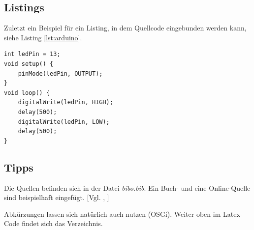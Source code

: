 \documentclass[12pt,a4paper,bibliography=totocnumbered,listof=totocnumbered]{scrartcl}
\begin{document}
\subsection{Listings}
Zuletzt ein Beispiel für ein Listing, in dem Quellcode eingebunden werden kann, siehe Listing \ref{lst:arduino}.

\vspace{1em}
\begin{lstlisting}[caption=Arduino Beispielprogramm, label=lst:arduino]
int ledPin = 13;
void setup() {
    pinMode(ledPin, OUTPUT);
}
void loop() {
    digitalWrite(ledPin, HIGH);
    delay(500);
    digitalWrite(ledPin, LOW);
    delay(500);
}
\end{lstlisting}

\subsection{Tipps}
Die Quellen befinden sich in der Datei \textit{bibo.bib}. Ein Buch- und eine Online-Quelle sind beispielhaft eingefügt. [Vgl. \cite{buch}, \cite{online}]

Abkürzungen lassen sich natürlich auch nutzen (\ac{OSGi}). Weiter oben im Latex-Code findet sich das Verzeichnis.
\pagebreak
\end{document}
